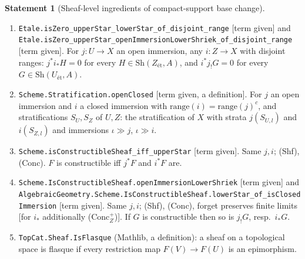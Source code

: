 \documentclass[10pt]{article}
\theoremstyle{definition}
\newtheorem{statement}[definition]{Statement}
\theoremstyle{remark}
\newcommand{\lean}[1]{{\small\nolinkurl{#1}}}
\newcommand{\PROVED}{\textcolor{green!40!black}{term given}}
\newcommand{\DEF}{definition}
\newcommand{\et}{\text{\'et}}
\newcommand{\Sh}[2]{\mathrm{Sh}({#1}_{\et},#2)}
\begin{document}
\begin{statement}[Sheaf-level ingredients of compact-support base change]
\begin{enumerate}
$i^*i_*\Rightarrow\mathrm{id}$ is an isomorphism.
\item \lean{Etale.isZero_upperStar_lowerStar_of_disjoint_range} [\PROVED] and
\lean{Etale.isZero_upperStar_openImmersionLowerShriek_of_disjoint_range} [\PROVED]. For $j:U\to X$
an open immersion, any $i:Z\to X$ with disjoint ranges: $j^*i_*H=0$ for every $H\in\Sh{Z}{A}$, and
$i^*j_!G=0$ for every $G\in\Sh{U}{A}$.
\item \lean{Scheme.Stratification.openClosed} [\PROVED, a \DEF]. For $j$ an open immersion and $i$ a closed
immersion with $\mathrm{range}(i)=\mathrm{range}(j)^c$, and stratifications $S_U,S_Z$ of $U,Z$:
the stratification of $X$ with strata $j(S_{U,l})$ and $i(S_{Z,l})$ and immersions $\iota\gg j$,
$\iota\gg i$.
\item \lean{Scheme.isConstructibleSheaf_iff_upperStar} [\PROVED]. Same $j,i$; (Shf), (Conc). $F$
is constructible iff $j^*F$ and $i^*F$ are.
\item \lean{Scheme.IsConstructibleSheaf.openImmersionLowerShriek} [\PROVED] and
\lean{AlgebraicGeometry.Scheme.IsConstructibleSheaf.lowerStar_of_isClosedImmersion} [\PROVED]. Same $j,i$; (Shf), (Conc), forget preserves finite
limits [for $i_*$ additionally (Conc$^+_Z$)]. If $G$ is constructible then so is $j_!G$, resp.\ $i_*G$.
\item \lean{TopCat.Sheaf.IsFlasque} (Mathlib, a \DEF): a sheaf on a topological space is flasque if
every restriction map $F(V)\to F(U)$ is an epimorphism.
\end{enumerate}
\end{statement}
\end{document}
